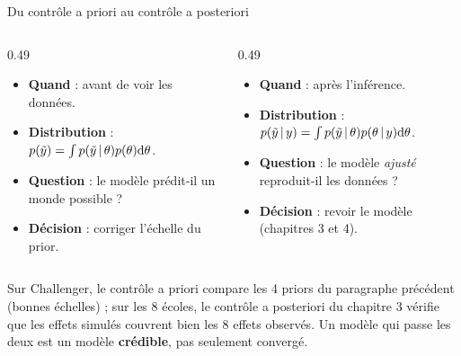 \begin{frame}{Du contrôle a priori au contrôle a posteriori}
\begin{columns}[t]
\begin{column}{0.49\textwidth}
\begin{kbox}
\begin{itemize}
  \item \textbf{Quand} : avant de voir les données.
  \item \textbf{Distribution} : $p(\tilde y) = \int p(\tilde y \,\vert\, \theta)p(\theta)\mathrm{d}\theta$.
  \item \textbf{Question} : le modèle prédit-il un monde possible ?
  \item \textbf{Décision} : corriger l'échelle du prior.
\end{itemize}
\end{kbox}
\end{column}
\begin{column}{0.49\textwidth}
\begin{kbox}
\begin{itemize}
  \item \textbf{Quand} : après l'inférence.
  \item \textbf{Distribution} : $p(\tilde y \,\vert\, y) = \int p(\tilde y \,\vert\, \theta)p(\theta \,\vert\, y)\mathrm{d}\theta$.
  \item \textbf{Question} : le modèle \emph{ajusté} reproduit-il les données ?
  \item \textbf{Décision} : revoir le modèle (chapitres 3 et 4).
\end{itemize}
\end{kbox}
\end{column}
\end{columns}
\vspace{1mm}
\begin{ebox}
Sur Challenger, le contrôle a priori compare les 4 priors du paragraphe précédent
(bonnes échelles) ; sur les 8 écoles, le contrôle a posteriori du chapitre 3 vérifie
que les effets simulés couvrent bien les 8 effets observés. Un modèle qui passe les
deux est un modèle \textbf{crédible}, pas seulement convergé.
\end{ebox}
\end{frame}

